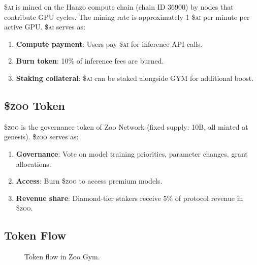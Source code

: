 \documentclass[11pt,letterpaper]{article}
\newcommand{\AI}{\$\textsc{ai}}
\newcommand{\ZOO}{\$\textsc{zoo}}
\begin{document}
\AI{} is mined on the Hanzo compute chain (chain ID 36900) by nodes that contribute GPU cycles.  The mining rate is approximately 1 \AI{} per minute per active GPU.  \AI{} serves as:

\begin{enumerate}
    \item \textbf{Compute payment}: Users pay \AI{} for inference API calls.
    \item \textbf{Burn token}: 10\% of inference fees are burned.
    \item \textbf{Staking collateral}: \AI{} can be staked alongside GYM for additional boost.
\end{enumerate}

\subsection{\ZOO{} Token}

\ZOO{} is the governance token of Zoo Network (fixed supply: 10B, all minted at genesis).  \ZOO{} serves as:

\begin{enumerate}
    \item \textbf{Governance}: Vote on model training priorities, parameter changes, grant allocations.
    \item \textbf{Access}: Burn \ZOO{} to access premium models.
    \item \textbf{Revenue share}: Diamond-tier stakers receive 5\% of protocol revenue in \ZOO{}.
\end{enumerate}

\subsection{Token Flow}

\begin{figure}[t]
\centering
{}
\caption{Token flow in Zoo Gym.}
\label{fig:token-flow}
\end{figure}
\end{document}
